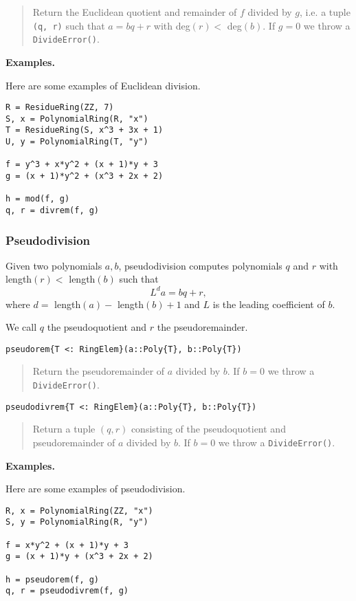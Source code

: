 \documentclass[a4paper,10pt]{article}
\newcommand{\code}{\lstinline}
\newcommand{\desc}[1]{\vspace{-3mm}\begin{quote}#1\end{quote}}
\begin{document}
\desc{Return the Euclidean quotient and remainder of $f$ divided by $g$, i.e.
a tuple \code{(q, r)} such that $a = bq + r$ with deg$(r) <$ deg$(b)$. If 
$g = 0$ we throw a \code{DivideError()}.}

\textbf{Examples.}

Here are some examples of Euclidean division.

\begin{lstlisting}
R = ResidueRing(ZZ, 7)
S, x = PolynomialRing(R, "x")
T = ResidueRing(S, x^3 + 3x + 1)
U, y = PolynomialRing(T, "y")

f = y^3 + x*y^2 + (x + 1)*y + 3
g = (x + 1)*y^2 + (x^3 + 2x + 2)

h = mod(f, g)
q, r = divrem(f, g)
\end{lstlisting}

\subsubsection{Pseudodivision}

Given two polynomials $a, b$, pseudodivision computes polynomials $q$ and $r$
with length$(r) <$ length$(b)$ such that
$$L^d a = bq + r,$$
where $d =$ length$(a) -$ length$(b) + 1$ and $L$ is the leading coefficient
of $b$.

We call $q$ the pseudoquotient and $r$ the pseudoremainder.

\begin{lstlisting}
pseudorem{T <: RingElem}(a::Poly{T}, b::Poly{T})
\end{lstlisting}

\desc{Return the pseudoremainder of $a$ divided by $b$. If $b = 0$ we throw a 
\code{DivideError()}.}

\begin{lstlisting}
pseudodivrem{T <: RingElem}(a::Poly{T}, b::Poly{T})
\end{lstlisting}

\desc{Return a tuple $(q, r)$ consisting of the pseudoquotient and pseudoremainder 
of $a$ divided by $b$. If $b = 0$ we throw a \code{DivideError()}.}

\textbf{Examples.}

Here are some examples of pseudodivision.

\begin{lstlisting}
R, x = PolynomialRing(ZZ, "x")
S, y = PolynomialRing(R, "y")

f = x*y^2 + (x + 1)*y + 3
g = (x + 1)*y + (x^3 + 2x + 2)

h = pseudorem(f, g)
q, r = pseudodivrem(f, g)
\end{lstlisting}
\end{document}
